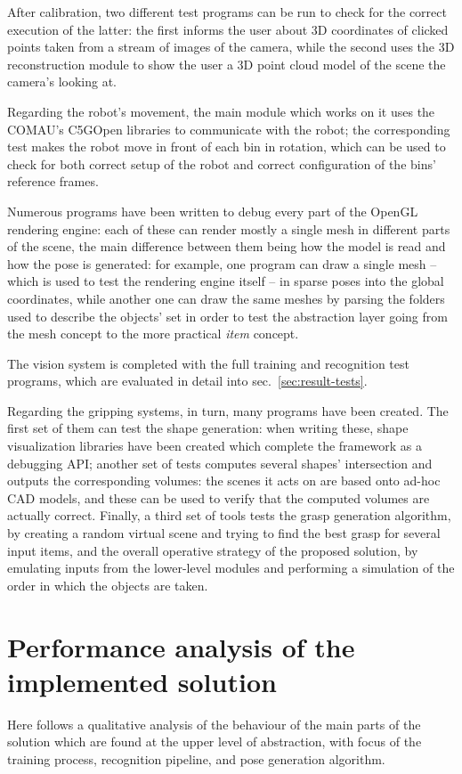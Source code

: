 After calibration, two different test programs can be run to check
for the correct execution of the latter: the first informs the user
about 3D coordinates of clicked points taken from a stream of images of
the camera, while the second uses the 3D reconstruction module to show
the user a 3D point cloud model of the scene the camera's looking at.

Regarding the robot's movement, the main module which works on it uses
the COMAU's C5GOpen libraries to communicate with the robot; the
corresponding test makes the robot move in front of each bin in
rotation, which can be used to check for both correct setup of the
robot and correct configuration of the bins' reference frames.

Numerous programs have been written to debug every part of the
OpenGL rendering engine: each of these can render mostly a single
mesh in different parts of the scene, the main difference between them
being how the model is read and how the pose is generated: for
example, one program can draw a single mesh -- which is used to test
the rendering engine itself -- in sparse poses into the global
coordinates, while another one can draw the same meshes by parsing 
the folders used to describe the objects' set in order to test the
abstraction layer going from the mesh concept to the more practical
\emph{item} concept.

The vision system is completed with the full training and recognition
test programs, which are evaluated in detail into
sec.~\ref{sec:result-tests}.

Regarding the gripping systems, in turn, many programs have been
created. The first set of them can test the shape generation: when
writing these, shape visualization libraries have been created which
complete the framework as a debugging API; another set of tests
computes several shapes' intersection and outputs the corresponding
volumes: the scenes it acts on are based onto ad-hoc CAD models, and
these can be used to verify that the computed volumes are actually
correct. Finally, a third set of tools tests the grasp generation
algorithm, by creating a random virtual scene and trying to find the best
grasp for several input items, and the overall operative strategy of
the proposed solution, by emulating inputs from the lower-level
modules and performing a simulation of the order in which the objects
are taken.

\section{Performance analysis of the implemented solution}
Here follows a qualitative analysis of the behaviour of the main parts
of the solution which are found at the upper level of abstraction,
with focus of the training process, recognition pipeline, and pose
generation algorithm.


